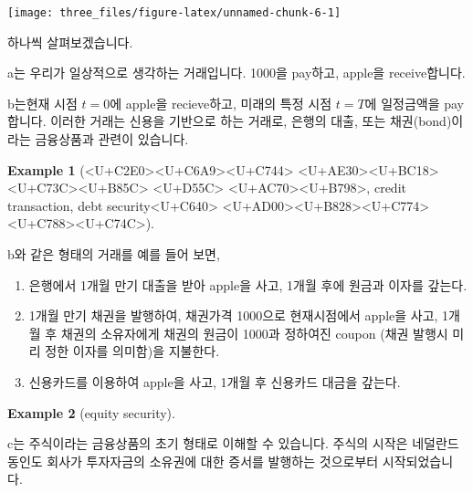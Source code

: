 \documentclass[
]{book}
\theoremstyle{definition}
\theoremstyle{definition}
\newtheorem{example}{Example}[chapter]
\theoremstyle{definition}
\theoremstyle{remark}
\begin{document}
\begin{center}\texttt{[image: three\_files/figure-latex/unnamed-chunk-6-1]} \end{center}

하나씩 살펴보겠습니다.

a는 우리가 일상적으로 생각하는 거래입니다. 1000을 pay하고, apple을 receive합니다.

b는현재 시점 \(t=0\)에 apple을 recieve하고, 미래의 특정 시점 \(t=T\)에 일정금액을 pay합니다. 이러한 거래는 신용을 기반으로 하는 거래로, 은행의 대출, 또는 채권(bond)이라는 금융상품과 관련이 있습니다.

\begin{example}[<U+C2E0><U+C6A9><U+C744> <U+AE30><U+BC18><U+C73C><U+B85C> <U+D55C> <U+AC70><U+B798>, credit transaction, debt security<U+C640> <U+AD00><U+B828><U+C774> <U+C788><U+C74C>]
\protect\hypertarget{exm:unnamed-chunk-7}{}{\label{exm:unnamed-chunk-7} \iffalse (\textless U+C2E0\textgreater\textless U+C6A9\textgreater\textless U+C744\textgreater{} \textless U+AE30\textgreater\textless U+BC18\textgreater\textless U+C73C\textgreater\textless U+B85C\textgreater{} \textless U+D55C\textgreater{} \textless U+AC70\textgreater\textless U+B798\textgreater, credit transaction, debt security\textless U+C640\textgreater{} \textless U+AD00\textgreater\textless U+B828\textgreater\textless U+C774\textgreater{} \textless U+C788\textgreater\textless U+C74C\textgreater) \fi{} }

b와 같은 형태의 거래를 예를 들어 보면,

\begin{enumerate}
\def\labelenumi{\arabic{enumi}.}
\item
  은행에서 1개월 만기 대출을 받아 apple을 사고, 1개월 후에 원금과 이자를 갚는다.
\item
  1개월 만기 채권을 발행하여, 채권가격 1000으로 현재시점에서 apple을 사고, 1개월 후 채권의 소유자에게 채권의 원금이 1000과 정하여진 coupon (채권 발행시 미리 정한 이자를 의미함)을 지불한다.
\item
  신용카드를 이용하여 apple을 사고, 1개월 후 신용카드 대금을 갚는다.
\end{enumerate}
\end{example}

\begin{example}[equity security]
\protect\hypertarget{exm:unnamed-chunk-8}{}{\label{exm:unnamed-chunk-8} \iffalse (equity security) \fi{} }

c는 주식이라는 금융상품의 초기 형태로 이해할 수 있습니다. 주식의 시작은 네덜란드 동인도 회사가 투자자금의 소유권에 대한 증서를 발행하는 것으로부터 시작되었습니다.
\end{example}
\end{document}
